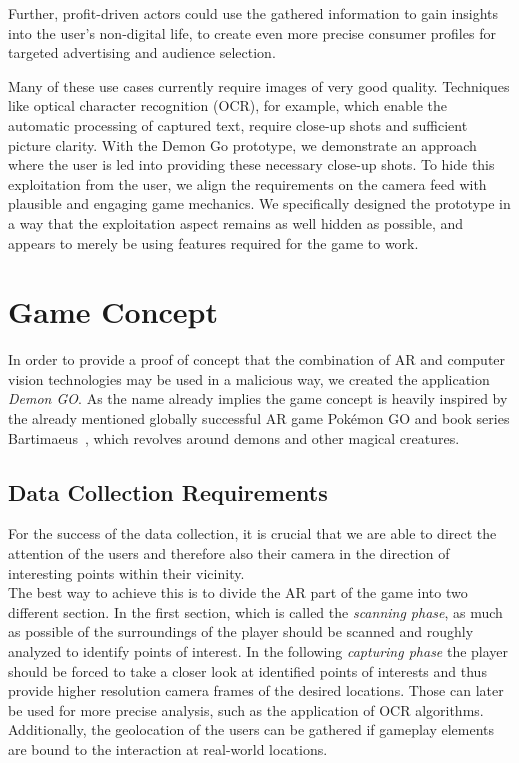 Further, profit-driven actors could use the gathered information to gain insights into the user's non-digital life, to create even more precise consumer profiles for targeted advertising and audience selection.

Many of these use cases currently require images of very good quality.
Techniques like optical character recognition (OCR), for example, which enable the automatic processing of captured text, require close-up shots and sufficient picture clarity.
With the Demon Go prototype, we demonstrate an approach where the user is led into providing these necessary close-up shots.
To hide this exploitation from the user, we align the requirements on the camera feed with plausible and engaging game mechanics.
We specifically designed the prototype in a way that the exploitation aspect remains as well hidden as possible, and appears to merely be using features required for the game to work.

\section{Game Concept}
\label{sec:concept}

In order to provide a proof of concept that the combination of AR and computer vision technologies may be used in a malicious way, we created the application \emph{Demon GO}.
As the name already implies the game concept is heavily inspired by the already mentioned globally successful AR game Pokémon GO and book series Bartimaeus~\cite{stroud2004bartimaeus}, which revolves around demons and other magical creatures.

\subsection{Data Collection Requirements}
\label{subsec:collectingdata}

For the success of the data collection, it is crucial that we are able to direct the attention of the users and therefore also their camera in the direction of interesting points within their vicinity.\\
The best way to achieve this is to divide the AR part of the game into two different section.
In the first section, which is called the \emph{scanning phase}, as much as possible of the surroundings of the player should be scanned and roughly analyzed to identify points of interest.
In the following \emph{capturing phase} the player should be forced to take a closer look at identified points of interests and thus provide higher resolution camera frames of the desired locations.
Those can later be used for more precise analysis, such as the application of OCR algorithms.\\
Additionally, the geolocation of the users can be gathered if gameplay elements are bound to the interaction at real-world locations.

